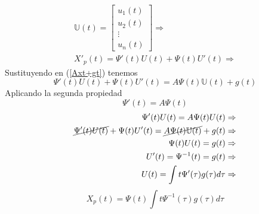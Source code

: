 \documentclass[12pt,spanish,lettersize,twocolumn]{article}
\begin{document}
\begin{eqnarray}
\mathbb{U}(t)=\left[
\begin{array}{c}
u_1(t)\\
u_2(t)\\
\vdots\\
u_n(t)
\end{array}
\right]\Rightarrow\\
X'_p(t)=\Psi'(t)U(t)+\Psi(t)U'(t)\Rightarrow
\end{eqnarray}
Sustituyendo en (\ref{Axt+gt}) tenemos
\begin{equation}
\Psi'(t)U(t)+\Psi(t)U'(t)=A\Psi(t)\mathbb{U}(t)+g(t)
\end{equation}
Aplicando la segunda propiedad\\
\begin{equation}
\nonumber \Psi'(t)=A\Psi(t)
\end{equation}
\begin{eqnarray}
\nonumber \Psi'(t)U(t)=A\Psi(t)U(t)\Rightarrow\\
\nonumber \cancel{\Psi'(t)U(t)}+\Psi(t)U'(t)=\cancel{A\Psi(t)\mathbb{U}(t)}+g(t)\Rightarrow\\
\Psi(t)U(t)=g(t)\Rightarrow\\
\nonumber U'(t)=\Psi^{-1}(t)=g(t)\Rightarrow\\
U(t)=\int\limits{}{t}\Psi'(\tau)g(\tau)d\tau\Rightarrow
\end{eqnarray}
\begin{equation}
X_p(t)=\Psi(t)\int\limits_{}{t}\Psi^{-1}(\tau)g(\tau)d\tau
\end{equation}
\end{document}

